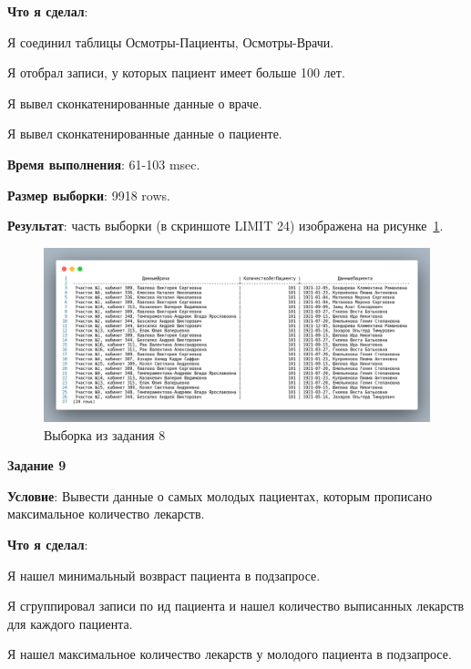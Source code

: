 \textbf{Что я сделал}:

Я соединил таблицы Осмотры-Пациенты, Осмотры-Врачи.

Я отобрал записи, у которых пациент имеет больше 100 лет.

Я вывел сконкатенированные данные о враче.

Я вывел сконкатенированные данные о пациенте.



\textbf{Время выполнения}: 61-103 msec.

\textbf{Размер выборки}: 9918 rows.

\textbf{Результат}: часть выборки (в скриншоте LIMIT 24) изображена на рисунке~\ref{fig:t8}.

\begin{figure}[!h]
  \centering

  \includegraphics[width=16cm]
  {../sql/task8/8-out.png}

  \caption{Выборка из задания 8}

  \label{fig:t8}
\end{figure}


\begin{center}
  \textbf{Задание 9}
\end{center}
  
\textbf{Условие}:
Вывести данные о самых молодых пациентах, которым прописано максимальное
количество лекарств.

\textbf{Что я сделал}:

Я нашел минимальный возвраст пациента в подзапросе.

Я сгруппировал записи по ид пациента и нашел количество выписанных лекарств для каждого пациента.

Я нашел максимальное количество лекарств у молодого пациента в подзапросе.

